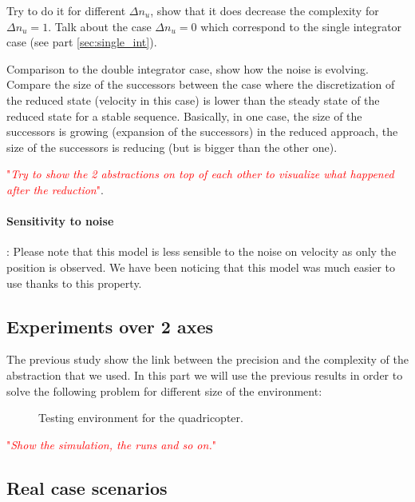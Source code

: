 \documentclass{article}
\theoremstyle{named}
\newcommand\comment[1]{\textcolor{red}{"\textit{#1}"}}
\begin{document}
Try to do it for different $\Delta n_u$, show that it does decrease the complexity for $\Delta n_u = 1$. Talk about the case $\Delta n_u = 0$ which correspond to the single integrator case (see part \ref{sec:single_int}).

Comparison to the double integrator case, show how the noise is evolving. Compare the size of the successors between the case where the discretization of the reduced state (velocity in this case) is lower than the steady state of the reduced state for a stable sequence. Basically, in one case, the size of the successors is growing (expansion of the successors) in the reduced approach, the size of the successors is reducing (but is bigger than the other one).


\comment{Try to show the 2 abstractions on top of each other to visualize what happened after the reduction}.

\paragraph{Sensitivity to noise}:
Please note that this model is less sensible to the noise on velocity as only the position is observed.
We have been noticing that this model was much easier to use thanks to this property.

\subsection{Experiments over 2 axes}

The previous study show the link between the precision and the complexity of the abstraction that we used.
In this part we will use the previous results in order to solve the following problem for different size of the environment:

\begin{figure}
	\center
	
	\caption{Testing environment for the quadricopter.}
	\label{fig:environment}
\end{figure}

\comment{Show the simulation, the runs and so on.}


\subsection{Real case scenarios}
\end{document}
